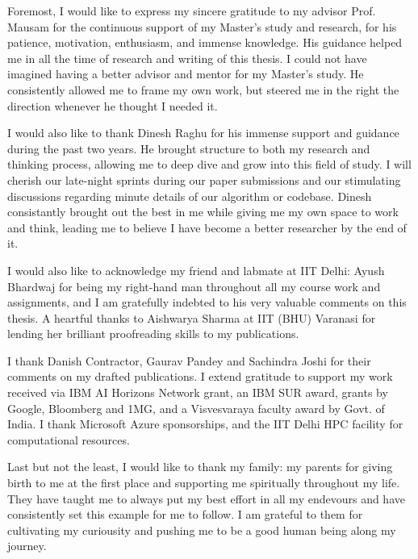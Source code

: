 Foremost, I would like to express my sincere gratitude to my advisor Prof. Mausam for the continuous support of my Master's study and research, for his patience, motivation, enthusiasm, and immense knowledge. His guidance helped me in all the time of research and writing of this thesis. I could not have imagined having a better advisor and mentor for my Master's study. He consistently allowed me to frame my own work, but steered me in the right the direction whenever he thought I needed it.

I would also like to thank Dinesh Raghu for his immense support and guidance during the past two years. He brought structure to both my research and thinking process, allowing me to deep dive and grow into this field of study. I will cherish our late-night sprints during our paper submissions and our stimulating discussions regarding minute details of our algorithm or codebase. Dinesh consistantly brought out the best in me while giving me my own space to work and think, leading me to believe I have become a better researcher by the end of it.

I would also like to acknowledge my friend and labmate at IIT Delhi: Ayush Bhardwaj for being my right-hand man throughout all my course work and assignments, and I am gratefully indebted to his very valuable comments on this thesis. A heartful thanks to Aishwarya Sharma at IIT (BHU) Varanasi for lending her brilliant proofreading skills to my publications.

I thank Danish Contractor, Gaurav Pandey and Sachindra Joshi for their comments on my drafted publications. I extend gratitude to support my work received via IBM AI Horizons Network grant, an IBM SUR award, grants by Google, Bloomberg and 1MG, and a Visvesvaraya faculty award by Govt. of India. I thank Microsoft Azure sponsorships, and the IIT Delhi HPC facility for computational resources.

Last but not the least, I would like to thank my family: my parents for giving birth to me at the first place and supporting me spiritually throughout my life. They have taught me to always put my best effort in all my endevours and have consistently set this example for me to follow. I am grateful to them for cultivating my curiousity and pushing me to be a good human being along my journey.